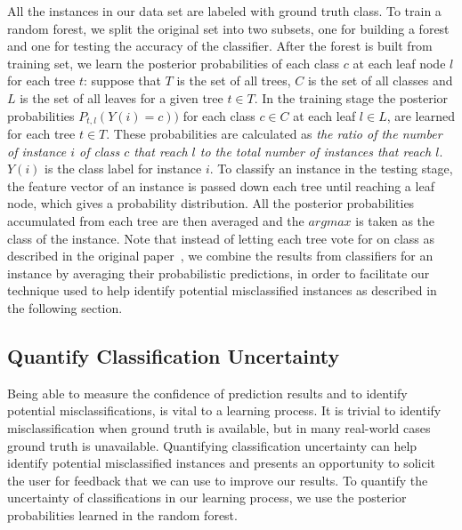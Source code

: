 All the instances in our data set are labeled with ground truth class. To train a random forest, we split the original set into two subsets, one for building 
a forest and one for testing the accuracy of the classifier. After the forest is built from training set, we learn the posterior probabilities of each class $c$ 
at each leaf node $l$ for each tree $t$: suppose that $T$ is the set of all trees, $C$ is the set of all classes and $L$ is the set of all leaves for a given 
tree $t\in T$. In the training stage the posterior probabilities $P_{t,l}(Y(i) = c))$ for each class $c\in C$ at each leaf $l\in L$, are learned for each tree $t\in T$. 
These probabilities are calculated as \textit{the ratio of the number of instance $i$ of class $c$ that reach $l$ to the total number of instances that reach $l$}. $Y(i)$ 
is the class label for instance $i$. To classify an instance in the testing stage, the feature vector of an instance is passed down each tree until reaching a leaf 
node, which gives a probability distribution. All the posterior probabilities accumulated from each tree are then averaged and the $argmax$ is taken as the class 
of the instance. Note that instead of letting each tree vote for on class as described in the original paper~\cite{RF}, we combine the results from classifiers for 
an instance by averaging their probabilistic predictions, in order to facilitate our technique used to help identify potential misclassified instances as described in the following section.  


\subsection{Quantify Classification Uncertainty}
Being able to measure the confidence of prediction results and to identify potential misclassifications, is vital to a learning process. 
It is trivial to 
identify misclassification when ground truth is available, but in many real-world cases ground truth is unavailable. %
Quantifying classification uncertainty can help identify potential misclassified instances and presents an opportunity to solicit 
the user for feedback that we can use to improve our results. To quantify the uncertainty of classifications in our learning process, we use
 the posterior probabilities learned in the random forest.


